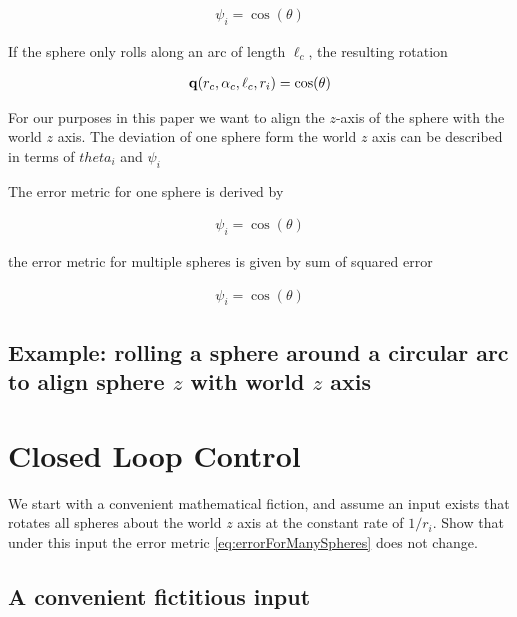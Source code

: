 \documentclass[letter paper, 10pt, conference]{ieeeconf}
\newcommand{\todo}[1]{\vspace{5 mm}\par \noindent \framebox{\begin{minipage}[c]{0.98 \columnwidth} \ttfamily\flushleft \textcolor{red}{#1}\end{minipage}}\vspace{5 mm}\par}
\begin{document}
\begin{align}
\psi_i = \cos( \theta) \label{eq:RotatingAboutACircle}
\end{align}

If the sphere only rolls along an arc of length $\ell_c$, the resulting rotation

\begin{align}
{\bf q}(r_c, \alpha_c, \ell_c, r_i)   = \cos( \theta) \label{eq:RotatingAboutACircleArc}
\end{align}


For our purposes in this paper we want to align the $z$-axis of the sphere with the world $z$ axis.  The deviation of one sphere form the world  $z$ axis can be described in terms of $theta_i$ and $\psi_i$  


 The error metric for one sphere is derived by
 
\begin{align}
\psi_i = \cos( \theta) \label{eq:errorForOneSphere}
\end{align}


 the error metric for multiple spheres is given by sum of squared error
 
\begin{align}
\psi_i = \cos( \theta) \label{eq:errorForManySpheres}\end{align}



\subsection{Example: rolling a sphere around a circular arc to align sphere $z$ with world $z$ axis}

\todo{solve this problem}




\section{Closed Loop Control}\label{sec:ClosedLoopControl}%

We start with a convenient mathematical fiction, and assume an input exists that rotates all spheres about the world $z$ axis at the constant rate of $1/r_i$.  
Show that under this input the error metric \eqref{eq:errorForManySpheres} does not change.

\subsection{A convenient fictitious input}
\end{document}

